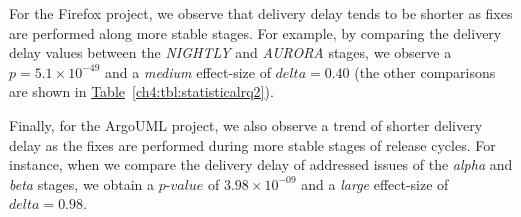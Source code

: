 For the Firefox project, we observe that delivery delay tends to be
shorter as fixes are performed along more stable stages. For example, by
comparing the delivery delay values between the {\em NIGHTLY} and {\em
AURORA} stages, we observe a $p=5.1 \times 10^{-49}$ and a {\em medium}
effect-size of $delta = 0.40$ (the other comparisons are shown in
\hyperref[ch4:tbl:statisticalrq2]{Table}~\ref{ch4:tbl:statisticalrq2}).

Finally, for the ArgoUML project, we also observe a trend of shorter
delivery delay as the fixes are performed during more stable stages of release
cycles. For instance, when we compare the delivery delay of addressed issues of the {\em alpha}
and {\em beta} stages, we obtain a $p$-$value$ of $3.98 \times 10^{-09}$ and a {\em
large} effect-size of $delta = 0.98$.\\

